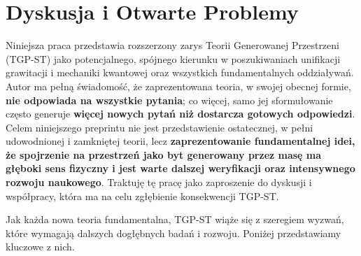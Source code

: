 \documentclass[11pt,a4paper]{article}
\begin{document}
\section{Dyskusja i Otwarte Problemy}
\label{sec:OtwarteProblemy}

Niniejsza praca przedstawia rozszerzony zarys Teorii Generowanej Przestrzeni (TGP-ST) jako potencjalnego, spójnego kierunku w poszukiwaniach unifikacji grawitacji i mechaniki kwantowej oraz wszystkich fundamentalnych oddziaływań. Autor ma pełną świadomość, że zaprezentowana teoria, w swojej obecnej formie, \textbf{nie odpowiada na wszystkie pytania}; co więcej, samo jej sformułowanie często generuje \textbf{więcej nowych pytań niż dostarcza gotowych odpowiedzi}. Celem niniejszego preprintu nie jest przedstawienie ostatecznej, w pełni udowodnionej i zamkniętej teorii, lecz \textbf{zaprezentowanie fundamentalnej idei, że spojrzenie na przestrzeń jako byt generowany przez masę ma głęboki sens fizyczny i jest warte dalszej weryfikacji oraz intensywnego rozwoju naukowego}. Traktuję tę pracę jako zaproszenie do dyskusji i współpracy, która ma na celu zgłębienie konsekwencji TGP-ST.

Jak każda nowa teoria fundamentalna, TGP-ST wiąże się z szeregiem wyzwań, które wymagają dalszych dogłębnych badań i rozwoju. Poniżej przedstawiamy kluczowe z nich.
\end{document}
